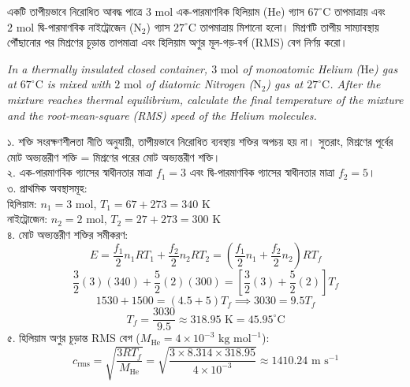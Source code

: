 \documentclass[12pt, a4paper]{article}
\begin{document}
\newpage
\begin{tcolorbox}[questionbox={প্রশ্ন (Question) 1}]
\noindent
একটি তাপীয়ভাবে নিরোধিত আবদ্ধ পাত্রে $3\text{ mol}$ এক-পারমাণবিক হিলিয়াম ($\text{He}$) গ্যাস $67^\circ\text{C}$ তাপমাত্রায় এবং $2\text{ mol}$ দ্বি-পারমাণবিক নাইট্রোজেন ($\text{N}_2$) গ্যাস $27^\circ\text{C}$ তাপমাত্রায় মিশানো হলো। মিশ্রণটি তাপীয় সাম্যাবস্থায় পৌঁছানোর পর মিশ্রণের চূড়ান্ত তাপমাত্রা এবং হিলিয়াম অণুর মূল-গড়-বর্গ (RMS) বেগ নির্ণয় করো।

\vspace{0.8em}
\begin{english}
\noindent\textit{\color{darkgray}
In a thermally insulated closed container, $3\text{ mol}$ of monoatomic Helium ($\text{He}$) gas at $67^\circ\text{C}$ is mixed with $2\text{ mol}$ of diatomic Nitrogen ($\text{N}_2$) gas at $27^\circ\text{C}$. After the mixture reaches thermal equilibrium, calculate the final temperature of the mixture and the root-mean-square (RMS) speed of the Helium molecules.
}
\end{english}
\end{tcolorbox}

\vspace{1em}

\begin{tcolorbox}[solutionbox={সমাধান (Solution)}]
\noindent
১. শক্তি সংরক্ষণশীলতা নীতি অনুযায়ী, তাপীয়ভাবে নিরোধিত ব্যবস্থায় শক্তির অপচয় হয় না। সুতরাং, মিশ্রণের পূর্বের মোট অভ্যন্তরীণ শক্তি = মিশ্রণের পরের মোট অভ্যন্তরীণ শক্তি। \\
২. এক-পারমাণবিক গ্যাসের স্বাধীনতার মাত্রা $f_1 = 3$ এবং দ্বি-পারমাণবিক গ্যাসের স্বাধীনতার মাত্রা $f_2 = 5$। \\
৩. প্রাথমিক অবস্থাসমূহ: \\
হিলিয়াম: $n_1 = 3\text{ mol}$, $T_1 = 67 + 273 = 340\text{ K}$ \\
নাইট্রোজেন: $n_2 = 2\text{ mol}$, $T_2 = 27 + 273 = 300\text{ K}$ \\
৪. মোট অভ্যন্তরীণ শক্তির সমীকরণ:
\[ E = \frac{f_1}{2} n_1 R T_1 + \frac{f_2}{2} n_2 R T_2 = \left(\frac{f_1}{2} n_1 + \frac{f_2}{2} n_2\right) R T_f \]
\[ \frac{3}{2}(3)(340) + \frac{5}{2}(2)(300) = \left[\frac{3}{2}(3) + \frac{5}{2}(2)\right] T_f \]
\[ 1530 + 1500 = (4.5 + 5) T_f \implies 3030 = 9.5 T_f \]
\[ T_f = \frac{3030}{9.5} \approx 318.95\text{ K} = 45.95^\circ\text{C} \]
৫. হিলিয়াম অণুর চূড়ান্ত RMS বেগ ($M_{\text{He}} = 4 \times 10^{-3}\text{ kg mol}^{-1}$):
\[ c_{\text{rms}} = \sqrt{\frac{3 R T_f}{M_{\text{He}}}} = \sqrt{\frac{3 \times 8.314 \times 318.95}{4 \times 10^{-3}}} \approx 1410.24\text{ m s}^{-1} \]
\end{tcolorbox}
\end{document}
